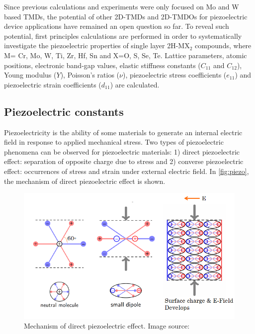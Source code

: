 Since previous calculations and experiments were only focused on Mo and W based TMDs, the potential of other 2D-TMDs and 2D-TMDOs for piezoelectric device applications have remained an open question so far. To reveal such potential, first principles calculations are performed in order to systematically investigate the piezoelectric properties of single layer 2H-MX$_2$ compounds, where M= Cr,  Mo, W, Ti, Zr, Hf, Sn and X=O, S, Se, Te.  Lattice parameters, atomic positions, electronic band-gap values, elastic stiffness constants ($C_{11}$ and $C_{12}$), Young modulus ($Y$), Poisson's ratios ($\nu$), piezoelectric stress coefficients ($e_{11}$) and piezoelectric strain coefficients ($d_{11}$) are calculated. 

\subsection{Piezoelectric constants}

Piezoelectricity is the ability of some materials to generate an internal electric field in response to applied mechanical stress. Two types of piezoelectric phenomena can be observed for piezoelectric materials: 1) direct piezoelectric effect: separation of opposite charge due to stress and 2) converse piezoelectric effect: occurrences of stress and strain under external electric field. In \autoref{fig:piezo}, the mechanism of direct piezoelectric effect is shown. 

\begin{figure}[htbp]
\centering
\includegraphics[width=0.8\linewidth]{piezo.png}%
\caption{Mechanism of direct piezoelectric effect\label{fig:piezo}. Image source: \cite{piezo_fig}}
\end{figure}

